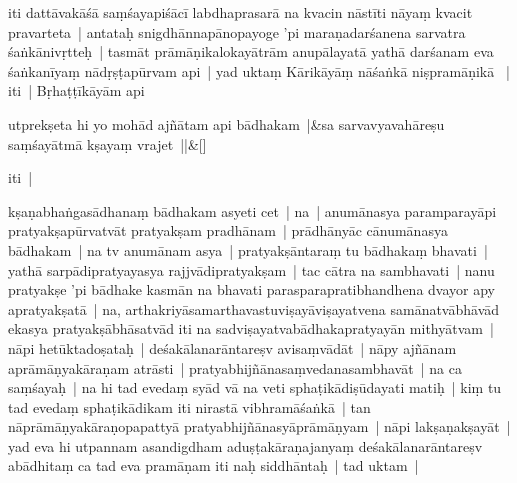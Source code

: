 \documentclass[article,12pt,a4paper]{memoir}%
\newcounter{parCount}
\begin{document}
	  
	  \pstart \leavevmode%
	iti dattāvakāśā saṃśayapiśācī labdhaprasarā na kvacin nāstīti nāyaṃ kvacit pravarteta | antataḥ snigdhānnapānopayoge 'pi maraṇadarśanena sarvatra śaṅkānivṛtteḥ | tasmāt prāmāṇikalokayātrām anupālayatā yathā darśanam eva śaṅkanīyaṃ nādṛṣṭapūrvam api | \label{thakur75-112.18} yad uktaṃ Kārikāyāṃ nāśaṅkā niṣpramāṇikā  | iti | Bṛhaṭṭīkāyām api
	{}
	\pend%
      
	    
	    \stanza[\smallbreak]
	  utprekṣeta hi yo mohād ajñātam api bādhakam |&sa sarvavyavahāreṣu saṃśayātmā kṣayaṃ vrajet ||\&[\smallbreak]
	  
	  
	  

	  
	  \pstart \leavevmode%
	iti |
	{}
	\pend%
      

	  
	  \pstart \leavevmode%
	\label{thakur75-112.24}kṣaṇabhaṅgasādhanaṃ bādhakam asyeti cet | na | anumānasya paramparayāpi pratyakṣapūrvatvāt pratyakṣam pradhānam | prādhānyāc cānumānasya bādhakam | na tv anumānam asya | pratyakṣāntaraṃ tu bādhakaṃ bhavati | yathā sarpādipratyayasya rajjvādipratyakṣam | tac cātra na sambhavati | \label{thakur75-112.28} nanu pratyakṣe 'pi bādhake kasmān na bhavati parasparapratibhandhena dvayor apy apratyakṣatā | \label{thakur75-112.28a} na, arthakriyāsamarthavastuviṣayāviṣayatvena samānatvābhāvād ekasya pratyakṣābhāsatvād iti na sadviṣayatvabādhakapratyayān mithyātvam | \label{thakur75-113.1} nāpi hetūktadoṣataḥ | deśakālanarāntareṣv avisaṃvādāt | \label{thakur75-113.2} nāpy ajñānam aprāmāṇyakāraṇam atrāsti | pratyabhijñānasaṃvedanasambhavāt | \label{thakur75-113.3} na ca saṃśayaḥ | na hi tad evedaṃ syād vā na veti sphaṭikādiṣūdayati matiḥ | kiṃ tu tad evedaṃ sphaṭikādikam iti nirastā vibhramāśaṅkā | tan nāprāmāṇyakāraṇopapattyā pratyabhijñānasyāprāmāṇyam | \label{thakur75-113.5} nāpi lakṣaṇakṣayāt | yad eva hi utpannam asandigdham aduṣṭakāraṇajanyaṃ deśakālanarāntareṣv abādhitaṃ ca tad eva pramāṇam iti naḥ siddhāntaḥ | tad uktam |
	{}
	\pend%
      
\end{document}

